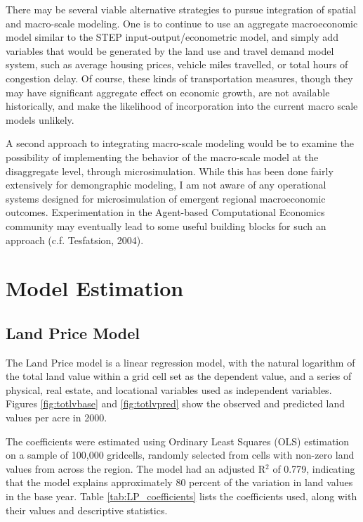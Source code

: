 There may be several viable alternative strategies to pursue
integration of spatial and macro-scale modeling. One is to
continue to use an aggregate macroeconomic model similar to the
STEP input-output/econometric model, and simply add variables that
would be generated by the land use and travel demand model system,
such as average housing prices, vehicle miles travelled, or total
hours of congestion delay.  Of course, these kinds of
transportation measures, though they may have significant
aggregate effect on economic growth, are not available
historically, and make the likelihood of incorporation into the
current macro scale models unlikely.

A second approach to integrating macro-scale modeling would be to
examine the possibility of implementing the behavior of the
macro-scale model at the disaggregate level, through
microsimulation.  While this has been done fairly extensively for
demongraphic modeling, I am not aware of any operational systems
designed for microsimulation of emergent regional macroeconomic
outcomes. Experimentation in the Agent-based Computational
Economics community may eventually lead to some useful building
blocks for such an approach (c.f. Tesfatsion, 2004).

\section{Model Estimation}
\subsection{Land Price Model}

The Land Price model is a linear regression model, with the
natural logarithm of the total land value within a grid cell set
as the dependent value, and a series of physical, real estate, and
locational variables used as independent variables.  Figures
\ref{fig:totlvbase} and \ref{fig:totlvpred} show the observed and
predicted land values per acre in 2000.

The coefficients were estimated using Ordinary Least Squares (OLS)
estimation on a sample of 100,000 gridcells, randomly selected
from cells with non-zero land values from across the region.  The
model had an adjusted R\(^{2}\) of 0.779, indicating that the
model explains approximately 80 percent of the variation in land
values in the base year. Table \ref{tab:LP_coefficients} lists the
coefficients used, along with their values and descriptive
statistics.


